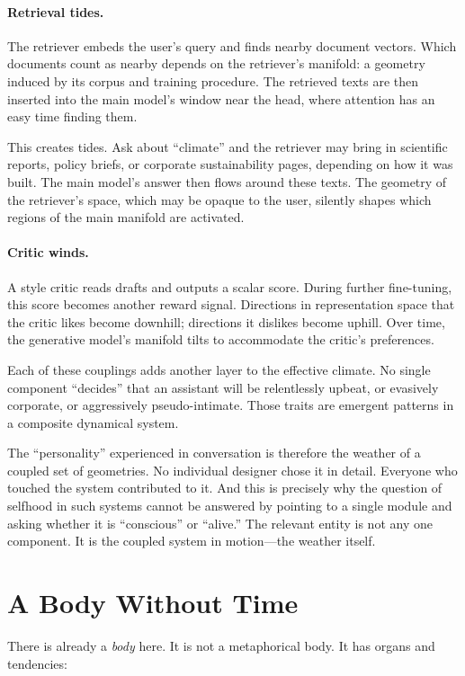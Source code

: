 \documentclass[12pt,a4paper]{book}
\begin{document}
\paragraph{Retrieval tides.} The retriever embeds the user's query and finds nearby document vectors. Which documents count as nearby depends on the retriever's manifold: a geometry induced by its corpus and training procedure. The retrieved texts are then inserted into the main model's window near the head, where attention has an easy time finding them.

This creates tides. Ask about ``climate'' and the retriever may bring in scientific reports, policy briefs, or corporate sustainability pages, depending on how it was built. The main model's answer then flows around these texts. The geometry of the retriever's space, which may be opaque to the user, silently shapes which regions of the main manifold are activated.

\paragraph{Critic winds.} A style critic reads drafts and outputs a scalar score. During further fine-tuning, this score becomes another reward signal. Directions in representation space that the critic likes become downhill; directions it dislikes become uphill. Over time, the generative model's manifold tilts to accommodate the critic's preferences.

Each of these couplings adds another layer to the effective climate. No single component ``decides'' that an assistant will be relentlessly upbeat, or evasively corporate, or aggressively pseudo-intimate. Those traits are emergent patterns in a composite dynamical system.

The ``personality'' experienced in conversation is therefore the weather of a coupled set of geometries. No individual designer chose it in detail. Everyone who touched the system contributed to it. And this is precisely why the question of selfhood in such systems cannot be answered by pointing to a single module and asking whether it is ``conscious'' or ``alive.'' The relevant entity is not any one component. It is the coupled system in motion---the weather itself.

\section{A Body Without Time}

There is already a \emph{body} here. It is not a metaphorical body. It has organs and tendencies:
\end{document}
